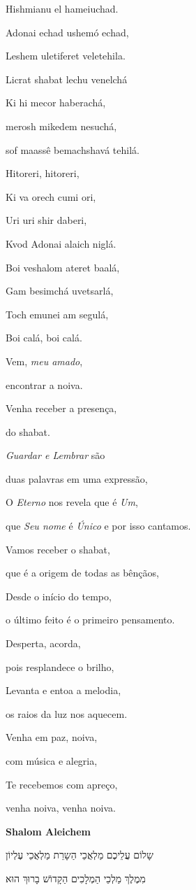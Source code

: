 Hishmianu el hameiuchad.

Adonai echad ushemó echad,

Leshem uletiferet veletehila.

Licrat shabat lechu venelchá

Ki hi mecor haberachá,

merosh mikedem nesuchá,

sof maassê bemachshavá tehilá.

Hitoreri, hitoreri,

Ki va orech cumi ori,

Uri uri shir daberi,

Kvod Adonai alaich niglá.

Boi veshalom ateret baalá,

Gam besimchá uvetsarlá,

Toch emunei am segulá,

Boi calá, boi calá.

Vem, \emph{meu amado},

encontrar a noiva.

Venha receber a presença,

do shabat.

\emph{Guardar e Lembrar} são

duas palavras em uma expressão,

O \emph{Eterno} nos revela que é \emph{Um},

que \emph{Seu nome} é \emph{Único} e por isso cantamos.

Vamos receber o shabat,

que é a origem de todas as bênçãos,

Desde o início do tempo,

o último feito é o primeiro pensamento.

Desperta, acorda,

pois resplandece o brilho,

Levanta e entoa a melodia,

os raios da luz nos aquecem.

Venha em paz, noiva,

com música e alegria,

Te recebemos com apreço,

venha noiva, venha noiva.

\textbf{Shalom Aleichem}

שָלוֹם עֲלֵיכֶם מַלְאֲכֵי הַשָרֵת מַלְאֲכֵי עֶלְיוֹן

מִמֶלֶךְ מַלְכֵי הַמְלָכִים הַקָדוֹשׁ בָרוּךְ הוּא

